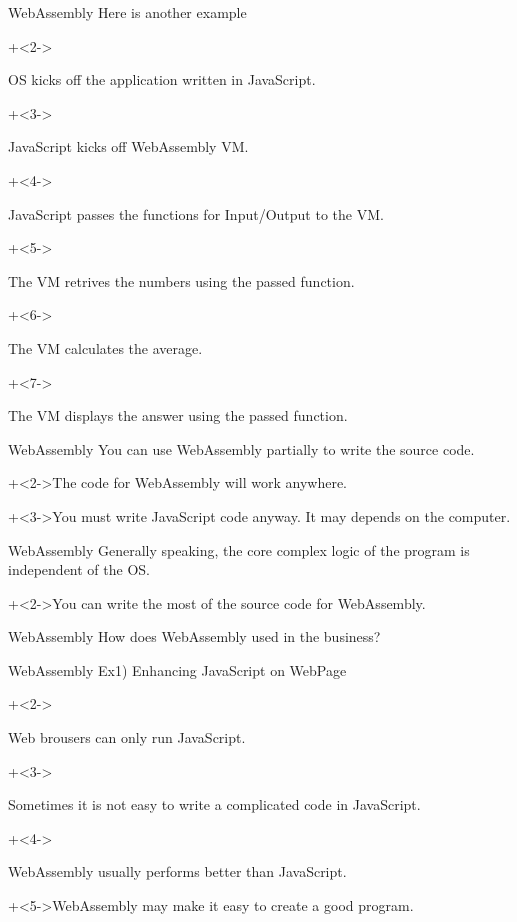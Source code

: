 \begin{frame}{WebAssembly}{}
    Here is another example
    \vspace{2ex}

    \begin{enumerate}
        \onslide+<2->{\item OS kicks off the application written in JavaScript.}
        \onslide+<3->{\item JavaScript kicks off WebAssembly VM.}
        \onslide+<4->{\item JavaScript passes the functions for Input/Output to the VM.}
        \onslide+<5->{\item The VM retrives the numbers using the passed function.}
        \onslide+<6->{\item The VM calculates the average.}
        \onslide+<7->{\item The VM displays the answer using the passed function.}
    \end{enumerate}
\end{frame}


\begin{frame}{WebAssembly}{}
    You can use WebAssembly partially to write the source code.
    \vspace{4ex}

    \onslide+<2->{The code for WebAssembly will work anywhere.}
    \vspace{4ex}

    \onslide+<3->{You must write JavaScript code anyway. It may depends on the computer.}
\end{frame}


\begin{frame}{WebAssembly}{}
    Generally speaking, the core complex logic of the program is independent of the OS.
    \vspace{4ex}

    \onslide+<2->{You can write the most of the source code for WebAssembly.}
\end{frame}


\begin{frame}{WebAssembly}{}
    {\Large How does WebAssembly used in the business?}
\end{frame}


\begin{frame}{WebAssembly}{}
    Ex1) Enhancing JavaScript on WebPage
    \vspace{4ex}

    \begin{itemize}
        \onslide+<2->{\item Web brousers can only run JavaScript.}
        \onslide+<3->{\item Sometimes it is not easy to write a complicated code in JavaScript.}
        \onslide+<4->{\item WebAssembly usually performs better than JavaScript.}
    \end{itemize}
    \vspace{4ex}

    \onslide+<5->{WebAssembly may make it easy to create a good program.}
\end{frame}


